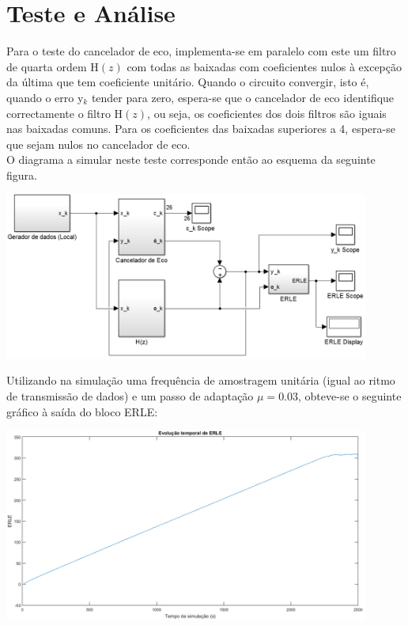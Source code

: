 \documentclass[a4paper,11pt]{report}
\begin{document}
\section{Teste e Análise}

Para o teste do cancelador de eco, implementa-se em paralelo com este um filtro de quarta ordem H$(z)$ com todas as baixadas com coeficientes nulos à excepção da última que tem coeficiente unitário. Quando o circuito convergir, isto é, quando o erro y$_k$ tender para zero, espera-se que o cancelador de eco identifique correctamente o filtro H$(z)$, ou seja, os coeficientes dos dois filtros são iguais nas baixadas comuns. Para os coeficientes das baixadas superiores a 4, espera-se que sejam nulos no cancelador de eco.\\

O diagrama a simular neste teste corresponde então ao esquema da seguinte figura.

\begin{center}
     \includegraphics[angle=0,width=0.9\textwidth]{testecancelador.png}
     \label{fig:testecancelador}
     \end{center}

Utilizando na simulação uma frequência de amostragem unitária (igual ao ritmo de transmissão de dados) e um passo de adaptação $\mu=$0.03, obteve-se o seguinte gráfico à saída do bloco ERLE:

\begin{center}
     \includegraphics[angle=0,width=0.9\textwidth]{testecanceladorERLE.png}
     \label{fig:testecanceladorERLE}
     \end{center}
\end{document}

